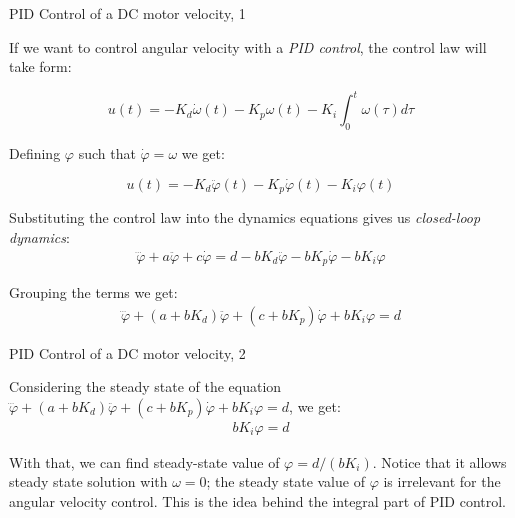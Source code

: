 \documentclass{beamer}
\begin{document}
\begin{frame}{PID Control of a DC motor velocity, 1}
	\begin{flushleft}
		
		If we want to control angular velocity with a \emph{PID control}, the control law will take form:
		
		\begin{equation}
			u(t) =  - K_d \dot \omega(t) - K_p \omega(t) - K_i \int_0^t \omega(\tau) d\tau
		\end{equation}
		
		Defining $\varphi$ such that $\dot \varphi = \omega$ we get:
		
		\begin{equation}
			u(t) = - K_d \ddot \varphi(t) - K_p \dot \varphi(t) - K_i \varphi(t)
		\end{equation}
		
		Substituting the control law into the dynamics equations gives us \emph{closed-loop dynamics}:
		\begin{align}
			\dddot \varphi  + a\ddot \varphi  + c\dot\varphi =
			d - bK_d \ddot \varphi - bK_p \dot \varphi - bK_i \varphi
		\end{align}
		
		Grouping the terms we get:
		\begin{align}
			\dddot \varphi  + (a+bK_d)\ddot \varphi  + (c+bK_p)\dot\varphi + bK_i \varphi = d
		\end{align}
		
	\end{flushleft}
\end{frame}



\begin{frame}{PID Control of a DC motor velocity, 2}
	\begin{flushleft}
		
		Considering the steady state of the equation $\dddot \varphi  + (a+bK_d)\ddot \varphi  + (c+bK_p)\dot\varphi + bK_i \varphi = d$, we get:
		\begin{align}
			bK_i \varphi = d
		\end{align}
	
		With that, we can find steady-state value of $\varphi = d / (bK_i)$. Notice that it allows steady state solution with $\omega = 0$; the steady state value of $\varphi$ is irrelevant for the angular velocity control. This is the idea behind the integral part of PID control.
		
	\end{flushleft}
\end{frame}
\end{document}
